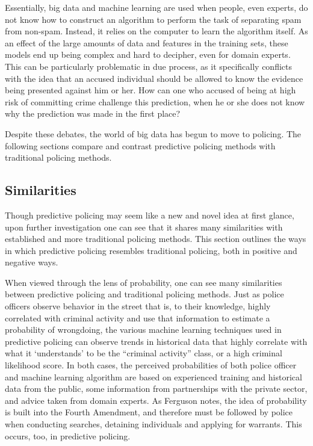 \documentclass[12pt]{article} %
\begin{document}
Essentially, big data and machine learning are used when people, even experts, do not know how to construct an algorithm to perform the task of separating spam from non-spam. Instead, it relies on the computer to learn the algorithm itself. As an effect of the large amounts of data and features in the training sets, these models end up being complex and hard to decipher, even for domain experts. This can be particularly problematic in due process, as it specifically conflicts with the idea that an accused individual should be allowed to know the evidence being presented against him or her. How can one who accused of being at high risk of committing crime challenge this prediction, when he or she does not know why the prediction was made in the first place?

Despite these debates, the world of big data has begun to move to policing. The following sections compare and contrast predictive policing methods with traditional policing methods.

\subsection{Similarities} \label{subsec:Similarities}
Though predictive policing may seem like a new and novel idea at first glance, upon further investigation one can see that it shares many similarities with established and more traditional policing methods. This section outlines the ways in which predictive policing resembles traditional policing, both in positive and negative ways.

When viewed through the lens of probability, one can see many similarities between predictive policing and traditional policing methods. Just as police officers observe behavior in the street that is, to their knowledge, highly correlated with criminal activity and use that information to estimate a probability of wrongdoing, the various machine learning techniques used in predictive policing can observe trends in historical data that highly correlate with what it `understands' to be the ``criminal activity'' class, or a high criminal likelihood score. In both cases, the perceived probabilities of both police officer and machine learning algorithm are based on experienced training and historical data from the public, some information from partnerships with the private sector, and advice taken from domain experts. As Ferguson notes, the idea of probability is built into the Fourth Amendment, and therefore must be followed by police when conducting searches, detaining individuals and applying for warrants. This occurs, too, in predictive policing.\cite{ferguson2012predictive}
\end{document}
